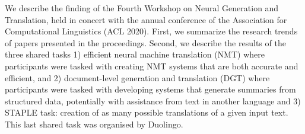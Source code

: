We describe the finding of the Fourth Workshop on Neural Generation and Translation, held in concert with the annual conference of the Association for Computational Linguistics (ACL 2020). First, we summarize the research trends of papers presented in the proceedings. Second, we describe the results of the three shared tasks 1) efficient neural machine translation (NMT) where participants were tasked with creating NMT systems that are both accurate and efficient, and  2) document-level generation and translation (DGT) where participants were tasked with developing systems that generate summaries from structured data, potentially with assistance from text in another language and 3) STAPLE task: creation of as many possible translations of a given input text. This last shared task was organised by Duolingo.

